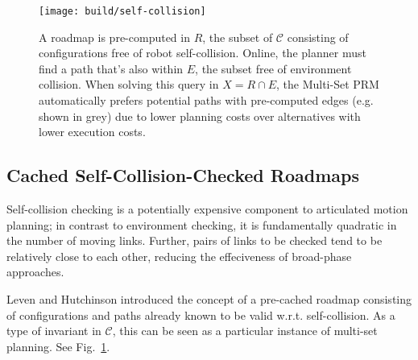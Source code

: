 \documentclass{report}
\begin{document}
\begin{figure}
\centering
\texttt{[image: build/self-collision]}
\caption{A roadmap is pre-computed in $R$,
  the subset of $\mathcal{C}$ consisting of configurations free
  of robot self-collision.
  Online, the planner must find a path that's also within $E$,
  the subset free of environment collision.
  When solving this query in $X = R \cap E$,
  the Multi-Set PRM automatically prefers potential paths with
  pre-computed edges (e.g. shown in grey)
  due to lower planning costs over alternatives with lower
  execution costs.}
\label{fig:self-collision-example}
\end{figure}

\subsection{Cached Self-Collision-Checked Roadmaps}
\label{subsec:cached-self-valid}

Self-collision checking is a potentially expensive component to
articulated motion planning;
in contrast to environment checking,
it is fundamentally quadratic in the number of moving links.
Further, pairs of links to be checked
tend to be relatively close to each other,
reducing the effeciveness of broad-phase approaches.

Leven and Hutchinson \cite{leven2000changing}
introduced the concept of a pre-cached roadmap consisting of
configurations and paths already known to be valid w.r.t.
self-collision.
As a type of invariant in $\mathcal{C}$,
this can be seen as a particular instance of multi-set planning.
See Fig.~\ref{fig:self-collision-example}.
\end{document}
